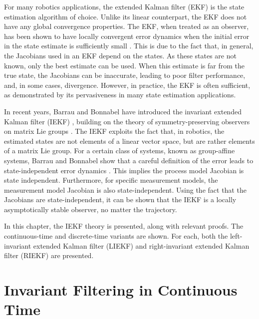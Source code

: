 
For many robotics applications, the extended Kalman filter (EKF) is the state estimation algorithm of choice. Unlike its linear counterpart, the EKF does not have any global convergence properties. The EKF, when treated as an observer, has been shown to have locally convergent error dynamics when the initial error in the state estimate is sufficiently  small \cite{Song1992,Krener2003}. This is due to the fact that, in general, the Jacobians used in an EKF depend on the states. As these states are not known, only the best estimate can be used. When this estimate is far from the true state, the Jacobians can be inaccurate, leading to poor filter performance, and, in some cases, divergence. However, in practice, the EKF is often sufficient, as demonstrated by its pervasiveness in many state estimation applications. 

In recent years, Barrau and Bonnabel have introduced the invariant extended Kalman filter (IEKF) \cite{Barrau2017}, building on the theory of symmetry-preserving observers on matrix Lie groups \cite{Bonnabel2008,Bonnabel2009}. The IEKF exploits the fact that, in robotics, the estimated states are not elements of a linear vector space, but are rather elements of a matrix Lie group. For a certain class of systems, known as group-affine systems, Barrau and Bonnabel show that a careful definition of the error leads to state-independent error dynamics \cite{Barrau2017}. This implies the process model Jacobian is state independent. Furthermore, for specific measurement models, the measurement model Jacobian is also state-independent. Using the fact that the Jacobians are state-independent, it can be shown that the IEKF is a locally asymptotically stable observer, no matter the trajectory.

In this chapter, the IEKF theory is presented, along with relevant proofs. The continuous-time \cite{Barrau2017} and discrete-time \cite{Barrau2018} variants are shown.  For each, both the left-invariant extended Kalman filter (LIEKF) and right-invariant extended Kalman filter (RIEKF) are presented.

\section{Invariant Filtering in Continuous Time}
\label{sec:IEKF_c}

